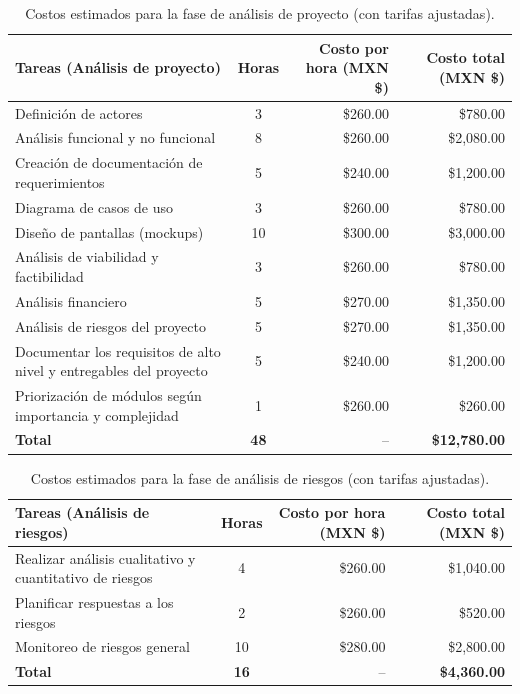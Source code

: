 \begin{table}[H]
	\centering
	\renewcommand{\arraystretch}{1.6}
	\setlength{\tabcolsep}{10pt}
	\Huge
	\begin{adjustbox}{max width=\textwidth}
		\begin{tabular}{|p{9.5cm}|c|r|r|}
			\hline
			\textbf{Tareas (Análisis de proyecto)} & \textbf{Horas} & \textbf{Costo por hora (MXN \$)} & \textbf{Costo total (MXN \$)} \\ \hline
			Definición de actores & 3 & \$260.00 & \$780.00 \\ \hline
			Análisis funcional y no funcional & 8 & \$260.00 & \$2,080.00 \\ \hline
			Creación de documentación de requerimientos & 5 & \$240.00 & \$1,200.00 \\ \hline
			Diagrama de casos de uso & 3 & \$260.00 & \$780.00 \\ \hline
			Diseño de pantallas (mockups) & 10 & \$300.00 & \$3,000.00 \\ \hline
			Análisis de viabilidad y factibilidad & 3 & \$260.00 & \$780.00 \\ \hline
			Análisis financiero & 5 & \$270.00 & \$1,350.00 \\ \hline
			Análisis de riesgos del proyecto & 5 & \$270.00 & \$1,350.00 \\ \hline
			Documentar los requisitos de alto nivel y entregables del proyecto & 5 & \$240.00 & \$1,200.00 \\ \hline
			Priorización de módulos según importancia y complejidad & 1 & \$260.00 & \$260.00 \\ \hline
			\textbf{Total} & \textbf{48} & -- & \textbf{\$12,780.00} \\ \hline
		\end{tabular}
	\end{adjustbox}
	\caption{Costos estimados para la fase de análisis de proyecto (con tarifas ajustadas).}
	\label{tab:costos_analisis_actualizado}
\end{table}

\begin{table}[H]
	\centering
	\renewcommand{\arraystretch}{1.6}
	\setlength{\tabcolsep}{10pt}
	\Huge
	\begin{adjustbox}{max width=\textwidth}
		\begin{tabular}{|p{9.5cm}|c|r|r|}
			\hline
			\textbf{Tareas (Análisis de riesgos)} & \textbf{Horas} & \textbf{Costo por hora (MXN \$)} & \textbf{Costo total (MXN \$)} \\ \hline
			Realizar análisis cualitativo y cuantitativo de riesgos & 4 & \$260.00 & \$1,040.00 \\ \hline
			Planificar respuestas a los riesgos & 2 & \$260.00 & \$520.00 \\ \hline
			Monitoreo de riesgos general & 10 & \$280.00 & \$2,800.00 \\ \hline
			\textbf{Total} & \textbf{16} & -- & \textbf{\$4,360.00} \\ \hline
		\end{tabular}
	\end{adjustbox}
	\caption{Costos estimados para la fase de análisis de riesgos (con tarifas ajustadas).}
	\label{tab:costos_riesgos_actualizado}
\end{table}

